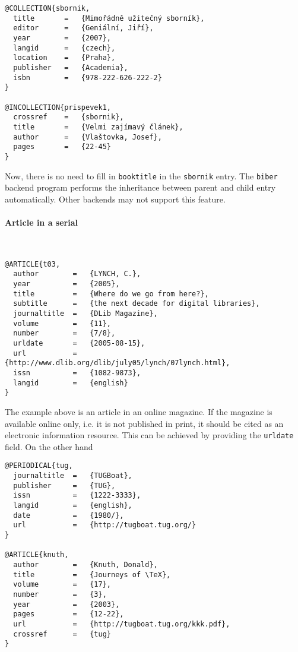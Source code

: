 \documentclass[a4paper,10pt]{ltxdockit}
\def\t|#1|{\texttt{#1}}
\def\c#1{%
\hangpara{3em}{1}%
\fullcite{#1}}
\begin{document}
\noindent\c{prispevek1}
 
\begin{verbatim}
@COLLECTION{sbornik,
  title       =   {Mimořádně užitečný sborník},
  editor      =   {Geniální, Jiří},
  year        =   {2007},
  langid      =   {czech},
  location    =   {Praha},
  publisher   =   {Academia},
  isbn        =   {978-222-626-222-2}
}

@INCOLLECTION{prispevek1,
  crossref    =   {sbornik},
  title       =   {Velmi zajímavý článek},
  author      =   {Vlaštovka, Josef},
  pages       =   {22-45}
}
\end{verbatim}

Now, there is no need to fill in \t|booktitle| in the \t|sbornik| entry.
The \t|biber| backend program performs the inheritance between parent and
child entry automatically. Other backends may not support this feature.

\paragraph{Article in a serial}\hfill\\

\c{t03}
\begin{verbatim}
@ARTICLE{t03,
  author        =   {LYNCH, C.},
  year          =   {2005},
  title         =   {Where do we go from here?},
  subtitle      =   {the next decade for digital libraries},
  journaltitle  =   {DLib Magazine},
  volume        =   {11},
  number        =   {7/8},
  urldate       =   {2005-08-15},
  url           =   {http://www.dlib.org/dlib/july05/lynch/07lynch.html}, 
  issn          =   {1082-9873},
  langid        =   {english}
}
\end{verbatim}

The example above is an article in an online magazine. If the magazine
is available online only, i.e. it is not published in print,
it should be cited as an electronic information resource. This can be
achieved by providing the \t|urldate| field. On the other hand
\newline

\c{knuth}
\begin{verbatim}
@PERIODICAL{tug,
  journaltitle  =   {TUGBoat},
  publisher     =   {TUG},
  issn          =   {1222-3333},
  langid        =   {english},
  date          =   {1980/},
  url           =   {http://tugboat.tug.org/}
}

@ARTICLE{knuth,
  author        =   {Knuth, Donald},
  title         =   {Journeys of \TeX},
  volume        =   {17},
  number        =   {3},
  year          =   {2003},
  pages         =   {12-22},
  url           =   {http://tugboat.tug.org/kkk.pdf},
  crossref      =   {tug}
}
\end{verbatim}
\end{document}
